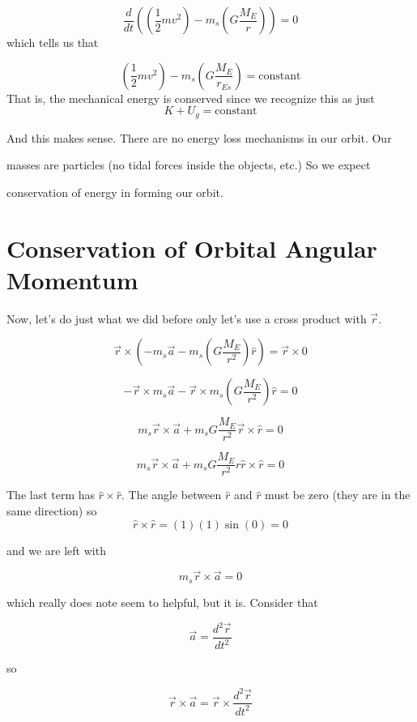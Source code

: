$$\frac{d}{dt}\left( \left( \frac{1}{2}mv^{2}\right) -m_{s}\left( G\frac{M_{E}}{r}\right) \right) =0 
$$%
which tells us that 

$$
\left( \frac{1}{2}mv^{2}\right) -m_{s}\left( G\frac{M_{E}}{r_{Es}}\right) =\text{constant} 
$$
That is, the mechanical energy is conserved since we recognize this as just 
$$K+U_{g}=\text{constant} $$

And this makes sense. There are no energy loss mechanisms in our orbit. Our

masses are particles (no tidal forces inside the objects, etc.) So we expect

conservation of energy in forming our orbit.


\section{Conservation of Orbital Angular Momentum}


Now, let's do just what we did before only let's use a cross product with 
$\overrightarrow{r}$. 

$$\overrightarrow{r}\times \left( -m_{s}\overrightarrow{a}-m_{s}\left( G\frac{M_{E}}{r^{2}}\right) \hat{r}\right) =\overrightarrow{r}\times 0
$$

$$-\overrightarrow{r}\times m_{s}\overrightarrow{a}-\overrightarrow{r}\times m_{s}\left( G\frac{M_{E}}{r^{2}}\right) \hat{r}=0
$$

$$m_{s}\overrightarrow{r}\times \overrightarrow{a}+m_{s}G\frac{M_{E}}{r^{2}}\overrightarrow{r}\times \hat{r}=0
$$

$$m_{s}\overrightarrow{r}\times \overrightarrow{a}+m_{s}G\frac{M_{E}}{r^{2}}r\hat{r}\times \hat{r}=0
$$

The last term has $\hat{r}\times \hat{r}.$ The angle between $\hat{r}$ and $\hat{r}$ must be zero (they are in the same direction) so 
$$\hat{r}\times \hat{r}=\left( 1\right) \left( 1\right) \sin \left( 0\right) =0$$

and we are left with 

$$m_{s}\overrightarrow{r}\times \overrightarrow{a}=0$$

which really does note seem to helpful, but it is. Consider that 

$$\overrightarrow{a}=\frac{d^{2}\overrightarrow{r}}{dt^{2}}$$

so 

$$\overrightarrow{r}\times \overrightarrow{a}=\overrightarrow{r}\times \frac{d^{2}\overrightarrow{r}}{dt^{2}}$$

